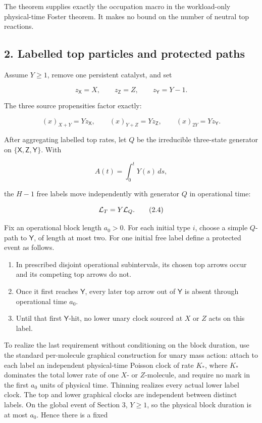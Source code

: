 The theorem supplies exactly the occupation macro in the workload-only
physical-time Foster theorem. It makes no bound on the number of neutral
top reactions.

\subsection{2. Labelled top particles and protected
paths}

Assume \(Y\ge1\), remove one persistent catalyst, and set

\[
 z_{\mathsf X}=X,\qquad z_{\mathsf Z}=Z,
 \qquad z_{\mathsf Y}=Y-1.                            \tag{2.1}
\]

The three source propensities factor exactly:

\[
 (x)_{X+Y}=Yz_{\mathsf X},\qquad
 (x)_{Y+Z}=Yz_{\mathsf Z},\qquad
 (x)_{2Y}=Yz_{\mathsf Y}.                            \tag{2.2}
\]

After aggregating labelled top rates, let \(Q\) be the irreducible
three-state generator on \(\{\mathsf X,\mathsf Z,\mathsf Y\}\). With

\[
                              A(t)=\int_0^tY(s)\,ds,  \tag{2.3}
\]

the \(H-1\) free labels move independently with generator \(Q\) in
operational time:

\[
                              {\cal L}_T=Y{\cal L}_Q. \tag{2.4}
\]

Fix an operational block length \(a_0>0\). For each initial type \(i\),
choose a simple \(Q\)-path to \(\mathsf Y\), of length at most two. For
one initial free label define a protected event as follows.

\begin{enumerate}
\def\labelenumi{\arabic{enumi}.}
\tightlist
\item
  In prescribed disjoint operational subintervals, its chosen top arrows
  occur and its competing top arrows do not.
\item
  Once it first reaches \(\mathsf Y\), every later top arrow out of
  \(\mathsf Y\) is absent through operational time \(a_0\).
\item
  Until that first \(\mathsf Y\)-hit, no lower unary clock sourced at
  \(X\) or \(Z\) acts on this label.
\end{enumerate}

To realize the last requirement without conditioning on the block
duration, use the standard per-molecule graphical construction for unary
mass action: attach to each label an independent physical-time Poisson
clock of rate \(K_*\), where \(K_*\) dominates the total lower rate of
one \(X\)- or \(Z\)-molecule, and require no mark in the first \(a_0\)
units of physical time. Thinning realizes every actual lower label
clock. The top and lower graphical clocks are independent between
distinct labels. On the global event of Section 3, \(Y\ge1\), so the
physical block duration is at most \(a_0\). Hence there is a fixed

